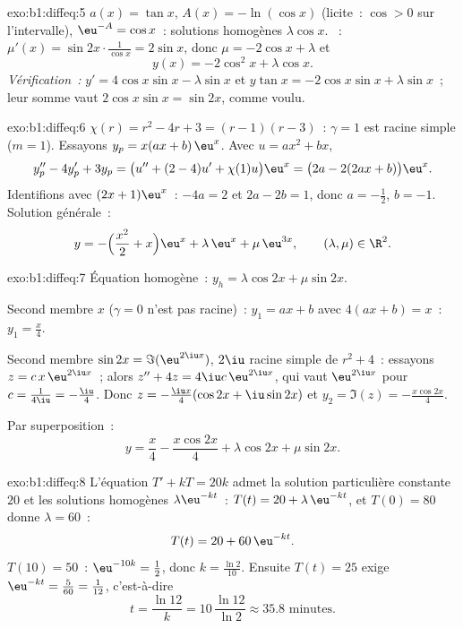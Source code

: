 \begin{solution}{exo:b1:diffeq:5}
$a(x) = \tan x$, $A(x) = -\ln(\cos x)$ (licite~: $\cos > 0$ sur
l'intervalle), $\eu^{-A} = \cos x$~: solutions homogènes
$\lambda\cos x$. ~: $\mu'(x) = \sin 2x \cdot
\frac{1}{\cos x} = 2\sin x$, donc $\mu = -2\cos x + \lambda$ et
\[
y(x) = -2\cos^2 x + \lambda \cos x .
\]
\emph{Vérification~:} $y' = 4\cos x \sin x - \lambda\sin x$ et
$y\tan x = -2\cos x\sin x + \lambda \sin x$~; leur somme vaut $2\cos
x\sin x = \sin 2x$, comme voulu.
\end{solution}

\begin{solution}{exo:b1:diffeq:6}
$\chi(r) = r^2 - 4r + 3 = (r-1)(r-3)$~: $\gamma = 1$ est racine simple
($m = 1$). Essayons $y_p = x(ax + b)\,\eu^x$. Avec $u = ax^2 + bx$,
\[
y_p'' - 4y_p' + 3y_p = \bigl(u'' + (2 - 4)u' + \chi(1) u\bigr)\eu^x
= \bigl(2a - 2(2ax + b)\bigr)\eu^x .
\]
Identifions avec $(2x + 1)\eu^x$~: $-4a = 2$ et $2a - 2b = 1$, donc $a
= -\frac12$, $b = -1$. Solution générale~:
\[
y = -\Bigl(\frac{x^2}{2} + x\Bigr)\eu^{x} + \lambda\,\eu^{x} +
\mu\,\eu^{3x}, \qquad (\lambda, \mu) \in \R^2 .
\]
\end{solution}

\begin{solution}{exo:b1:diffeq:7}
Équation homogène~: $y_h = \lambda\cos 2x + \mu\sin 2x$.

Second membre $x$ ($\gamma = 0$ n'est pas racine)~: $y_1 = ax + b$ avec
$4(ax + b) = x$~: $y_1 = \frac x4$.

Second membre $\sin 2x = \Im(\eu^{2\iu x})$, $2\iu$ racine simple de
$r^2 + 4$~: essayons $z = c\,x\,\eu^{2\iu x}$~; alors $z'' + 4z =
4\iu c\,\eu^{2\iu x}$, qui vaut $\eu^{2\iu x}$ pour $c =
\frac{1}{4\iu} = -\frac{\iu}{4}$. Donc $z = -\frac{\iu x}{4}(\cos 2x +
\iu \sin 2x)$ et $y_2 = \Im(z) = -\frac{x\cos 2x}{4}$.

Par superposition~:
\[
y = \frac{x}{4} - \frac{x\cos 2x}{4} + \lambda\cos 2x + \mu\sin 2x .
\]
\end{solution}

\begin{solution}{exo:b1:diffeq:8}
L'équation $T' + kT = 20k$ admet la solution particulière constante
$20$ et les solutions homogènes $\lambda\eu^{-kt}$~: $T(t) = 20 +
\lambda\,\eu^{-kt}$, et $T(0) = 80$ donne $\lambda = 60$~:
\[
T(t) = 20 + 60\,\eu^{-kt} .
\]
$T(10) = 50$~: $\eu^{-10k} = \frac12$, donc $k = \frac{\ln 2}{10}$.
Ensuite $T(t) = 25$ exige $\eu^{-kt} = \frac{5}{60} = \frac{1}{12}$,
c'est-à-dire
\[
t = \frac{\ln 12}{k} = 10\,\frac{\ln 12}{\ln 2} \approx 35.8
\text{ minutes.}
\]
\end{solution}

